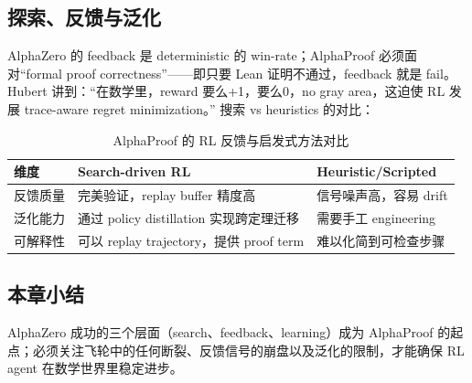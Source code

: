 \subsection{探索、反馈与泛化}
AlphaZero 的 feedback 是 deterministic 的 win-rate；AlphaProof 必须面对“formal proof correctness”——即只要 Lean 证明不通过，feedback 就是 fail。Hubert 讲到：“在数学里，reward 要么+1，要么0，no gray area，这迫使 RL 发展 trace-aware regret minimization。” 搜索 vs heuristics 的对比：
\begin{table}[H]
\centering
\begin{tabular}{p{4cm}p{4cm}p{4cm}}
\toprule
维度 & Search-driven RL & Heuristic/Scripted \\
\midrule
反馈质量 & 完美验证，replay buffer 精度高 & 信号噪声高，容易 drift \\
泛化能力 & 通过 policy distillation 实现跨定理迁移 & 需要手工 engineering \\
可解释性 & 可以 replay trajectory，提供 proof term & 难以化简到可检查步骤 \\
\bottomrule
\end{tabular}
\caption{AlphaProof 的 RL 反馈与启发式方法对比}
\end{table}

\subsection{本章小结}
AlphaZero 成功的三个层面（search、feedback、learning）成为 AlphaProof 的起点；必须关注飞轮中的任何断裂、反馈信号的崩盘以及泛化的限制，才能确保 RL agent 在数学世界里稳定进步。
\newpage


